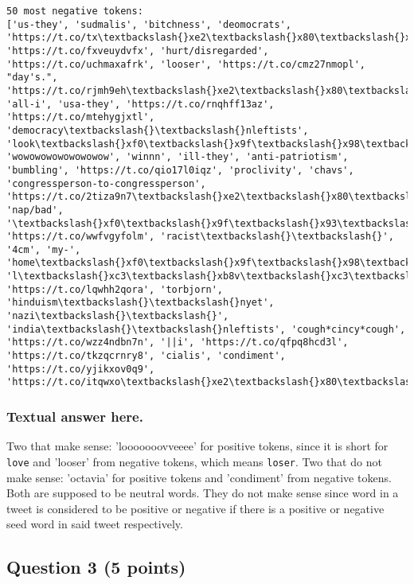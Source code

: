 \documentclass[11pt]{article}
\begin{document}
\begin{Verbatim}[commandchars=\\\{\}]
50 most negative tokens:  
['us-they', 'sudmalis', 'bitchness', 'deomocrats', 'https://t.co/tx\textbackslash{}xe2\textbackslash{}x80\textbackslash{}xa6', 'https://t.co/fxveuydvfx', 'hurt/disregarded', 'https://t.co/uchmaxafrk', 'looser', 'https://t.co/cmz27nmopl', "day's.", 'https://t.co/rjmh9eh\textbackslash{}xe2\textbackslash{}x80\textbackslash{}xa6', 'all-i', 'usa-they', 'https://t.co/rnqhff13az', 'https://t.co/mtehygjxtl', 'democracy\textbackslash{}\textbackslash{}nleftists', 'look\textbackslash{}xf0\textbackslash{}x9f\textbackslash{}x98\textbackslash{}x85', 'wowowowowowowowow', 'winnn', 'ill-they', 'anti-patriotism', 'bumbling', 'https://t.co/qio17l0iqz', 'proclivity', 'chavs', 'congressperson-to-congressperson', 'https://t.co/2tiza9n7\textbackslash{}xe2\textbackslash{}x80\textbackslash{}xa6', 'nap/bad', '\textbackslash{}xf0\textbackslash{}x9f\textbackslash{}x93\textbackslash{}x8csaying', 'https://t.co/wwfvgyfolm', 'racist\textbackslash{}\textbackslash{}', '4cm', 'my-', 'home\textbackslash{}xf0\textbackslash{}x9f\textbackslash{}x98\textbackslash{}xad', 'l\textbackslash{}xc3\textbackslash{}xb8v\textbackslash{}xc3\textbackslash{}xab', 'https://t.co/lqwhh2qora', 'torbjorn', 'hinduism\textbackslash{}\textbackslash{}nyet', 'nazi\textbackslash{}\textbackslash{}', 'india\textbackslash{}\textbackslash{}nleftists', 'cough*cincy*cough', 'https://t.co/wzz4ndbn7n', '||i', 'https://t.co/qfpq8hcd3l', 'https://t.co/tkzqcrnry8', 'cialis', 'condiment', 'https://t.co/yjikxov0q9', 'https://t.co/itqwxo\textbackslash{}xe2\textbackslash{}x80\textbackslash{}xa6']

    \end{Verbatim}

    \subsubsection{Textual answer here.}\label{textual-answer-here.}

    Two that make sense: 'looooooovveeee' for positive tokens, since it is
short for \texttt{love} and 'looser' from negative tokens, which means
\texttt{loser}. Two that do not make sense: 'octavia' for positive
tokens and 'condiment' from negative tokens. Both are supposed to be
neutral words. They do not make sense since word in a tweet is
considered to be positive or negative if there is a positive or negative
seed word in said tweet respectively.

    \subsection{Question 3 (5 points)}\label{question-3-5-points}
\end{document}
